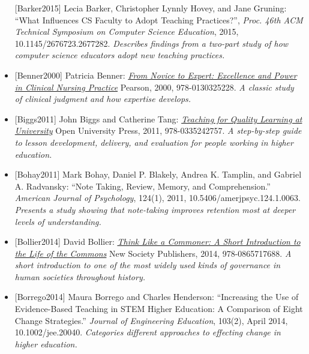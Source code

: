 \documentclass[10pt,statementpaper]{memoir}
\begin{document}
\begin{itemize}
  \protect\hypertarget{barker-practice-adoption}{}{{[}Barker2015{]}}
  Lecia Barker, Christopher Lynnly Hovey, and Jane Gruning: ``What
  Influences CS Faculty to Adopt Teaching Practices?'', \emph{Proc. 46th
  ACM Technical Symposium on Computer Science Education}, 2015,
  10.1145/2676723.2677282. \emph{Describes findings from a two-part
  study of how computer science educators adopt new teaching practices.}
\item
  \protect\hypertarget{benner-expertise}{}{{[}Benner2000{]}} Patricia
  Benner:
  \emph{\href{https://www.amazon.com/Novice-Expert-Excellence-Clinical-Commemorative/dp/0130325228/}{From
  Novice to Expert: Excellence and Power in Clinical Nursing Practice}}
  Pearson, 2000, 978-0130325228. \emph{A classic study of clinical
  judgment and how expertise develops.}
\item
  \protect\hypertarget{biggs-tang-quality}{}{{[}Biggs2011{]}} {John
  Biggs and Catherine Tang:
  \emph{\href{https://www.amazon.com/Teaching-Learning-University-Research-Education/dp/0335242758/}{Teaching
  for Quality Learning at University}} Open University Press, 2011,
  978-0335242757. \emph{A step-by-step guide to lesson development,
  delivery, and evaluation for people working in higher education.}}
\item
  \protect\hypertarget{bohay-note-taking}{}{{[}Bohay2011{]}} Mark Bohay,
  Daniel P. Blakely, Andrea K. Tamplin, and Gabriel A. Radvansky: ``Note
  Taking, Review, Memory, and Comprehension.'' \emph{American Journal of
  Psychology}, 124(1), 2011, 10.5406/amerjpsyc.124.1.0063.
  \emph{Presents a study showing that note-taking improves retention
  most at deeper levels of understanding.}
\item
  \protect\hypertarget{bollier-commoner}{}{{[}Bollier2014{]}} {David
  Bollier:
  \emph{\href{https://www.amazon.com/Think-Like-Commoner-Introduction-Commons/dp/0865717680/}{Think
  Like a Commoner: A Short Introduction to the Life of the Commons}} New
  Society Publishers, 2014, 978-0865717688. \emph{A short introduction
  to one of the most widely used kinds of governance in human societies
  throughout history.}}
\item
  \protect\hypertarget{borrego-henderson-change}{}{{[}Borrego2014{]}}
  Maura Borrego and Charles Henderson: ``Increasing the Use of
  Evidence-Based Teaching in STEM Higher Education: A Comparison of
  Eight Change Strategies.'' \emph{Journal of Engineering Education},
  103(2), April 2014, 10.1002/jee.20040. \emph{Categories different
  approaches to effecting change in higher education.}

\end{itemize}
\end{document}
